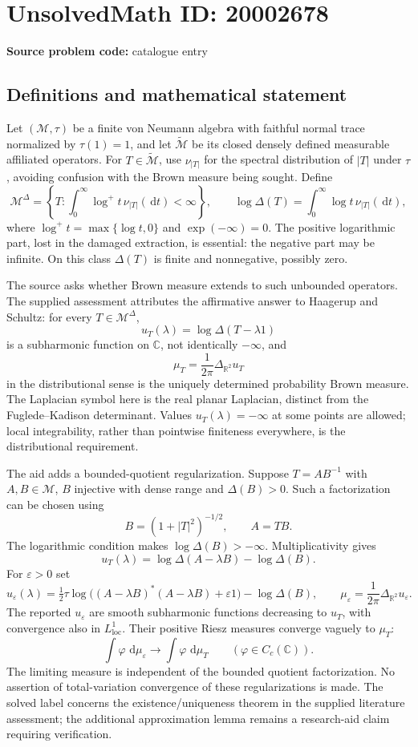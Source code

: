 \documentclass[11pt]{article}
\newcommand{\R}{\mathbb{R}}
\newcommand{\C}{\mathbb{C}}
\newcommand{\dd}{\,\mathrm{d}}
\begin{document}
\section*{UnsolvedMath ID: 20002678}
\textbf{Source problem code:} catalogue entry
\subsection{Definitions and mathematical statement}
Let $(\mathcal M,\tau)$ be a finite von Neumann algebra with faithful normal trace normalized by $\tau(1)=1$, and let $\widetilde{\mathcal M}$ be its closed densely defined measurable affiliated operators. For $T\in\widetilde{\mathcal M}$, use $\nu_{|T|}$ for the spectral distribution of $|T|$ under $\tau$, avoiding confusion with the Brown measure being sought. Define
\[
 \mathcal M^\Delta=\left\{T:\int_0^\infty\log^+t\,\nu_{|T|}(\dd t)<\infty\right\},
 \qquad
 \log\Delta(T)=\int_0^\infty\log t\,\nu_{|T|}(\dd t),
\]
where $\log^+t=\max\{\log t,0\}$ and $\exp(-\infty)=0$. The positive logarithmic part, lost in the damaged extraction, is essential: the negative part may be infinite. On this class $\Delta(T)$ is finite and nonnegative, possibly zero.

The source asks whether Brown measure extends to such unbounded operators. The supplied assessment attributes the affirmative answer to Haagerup and Schultz: for every $T\in\mathcal M^\Delta$,
\[
 u_T(\lambda)=\log\Delta(T-\lambda1)
\]
is a subharmonic function on $\C$, not identically $-\infty$, and
\[
 \mu_T=\frac1{2\pi}\Delta_{\R^2}u_T
\]
in the distributional sense is the uniquely determined probability Brown measure. The Laplacian symbol here is the real planar Laplacian, distinct from the Fuglede--Kadison determinant. Values $u_T(\lambda)=-\infty$ at some points are allowed; local integrability, rather than pointwise finiteness everywhere, is the distributional requirement.

The aid adds a bounded-quotient regularization. Suppose $T=AB^{-1}$ with $A,B\in\mathcal M$, $B$ injective with dense range and $\Delta(B)>0$. Such a factorization can be chosen using
\[
 B=(1+|T|^2)^{-1/2},\qquad A=TB.
\]
The logarithmic condition makes $\log\Delta(B)>-\infty$. Multiplicativity gives
\[
 u_T(\lambda)=\log\Delta(A-\lambda B)-\log\Delta(B).
\]
For $\varepsilon>0$ set
\[
 u_\varepsilon(\lambda)=\tfrac12\tau\log\bigl((A-\lambda B)^*(A-\lambda B)
                                         +\varepsilon1\bigr)
                         -\log\Delta(B),
 \qquad\mu_\varepsilon=\frac1{2\pi}\Delta_{\R^2}u_\varepsilon.
\]
The reported $u_\varepsilon$ are smooth subharmonic functions decreasing to $u_T$, with convergence also in $L^1_{\mathrm{loc}}$. Their positive Riesz measures converge vaguely to $\mu_T$:
\[
 \int\varphi\,\dd\mu_\varepsilon\longrightarrow
       \int\varphi\,\dd\mu_T
 \qquad(\varphi\in C_c(\C)).
\]
The limiting measure is independent of the bounded quotient factorization. No assertion of total-variation convergence of these regularizations is made. The solved label concerns the existence/uniqueness theorem in the supplied literature assessment; the additional approximation lemma remains a research-aid claim requiring verification.
\end{document}
